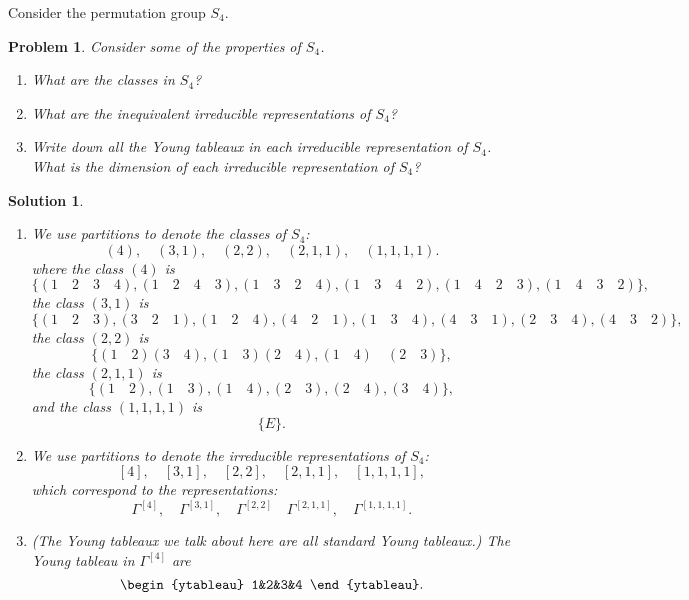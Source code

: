 \documentclass[UTF8,10pt,a4paper]{article}
\theoremstyle{Problem}
\newtheorem{prob}{Problem}
\theoremstyle{Solution}
\newtheorem*{sol}{Solution}
\begin{document}
\thispagestyle{FirstPageStyle}
Consider the permutation group $S_4$.
\begin{prob}
    Consider some of the properties of $S_4$.
    \begin{enumerate}
        \item[(a)] What are the classes in $S_4$?
        \item[(b)] What are the inequivalent irreducible representations of $S_4$?
        \item[(c)] Write down all the Young tableaux in each irreducible representation of $S_4$. What is the dimension of each irreducible representation of $S_4$?
    \end{enumerate}
\end{prob}
\begin{sol}
    \begin{enumerate}
        \item[(a)] We use partitions to denote the classes of $S_4$:
        \[
            (4),\quad(3,1),\quad(2,2),\quad(2,1,1),\quad(1,1,1,1).
        \]
        where the class $(4)$ is
        \[
            \{(1\quad 2\quad 3\quad 4),(1\quad 2\quad 4\quad 3),(1\quad 3\quad 2\quad 4),(1\quad 3\quad 4\quad 2),(1\quad 4\quad 2\quad 3),(1\quad 4\quad 3\quad 2)\},
        \]
        the class $(3,1)$ is
        \[
            \{(1\quad 2\quad 3),(3\quad 2\quad 1),(1\quad 2\quad 4),(4\quad 2\quad 1),(1\quad 3\quad 4),(4\quad 3\quad 1),(2\quad 3\quad 4),(4\quad 3\quad 2)\},
        \]
        the class $(2,2)$ is
        \[
            \{(1\quad 2)(3\quad 4),(1\quad 3)(2\quad 4),(1\quad 4)\quad (2\quad 3)\},
        \]
        the class $(2,1,1)$ is
        \[
            \{(1\quad 2),(1\quad 3),(1\quad 4),(2\quad 3),(2\quad 4),(3\quad 4)\},
        \]
        and the class $(1,1,1,1)$ is
        \[
            \{E\}.
        \]
        \item[(b)] We use partitions to denote the irreducible representations of $S_4$:
        \[
            [4],\quad[3,1],\quad[2,2],\quad[2,1,1],\quad[1,1,1,1],
        \]
        which correspond to the representations:
        \[
            \Gamma^{[4]},\quad\Gamma^{[3,1]},\quad\Gamma^{[2,2]}\quad\Gamma^{[2,1,1]},\quad\Gamma^{[1,1,1,1]}.
        \]
        \item[(c)] (The Young tableaux we talk about here are all standard Young tableaux.) The Young tableau in $\Gamma^{[4]}$ are
        \[
            \begin{ytableau}
                1&2&3&4
            \end{ytableau}.
\]
\end{enumerate}
\end{sol}
\end{document}
